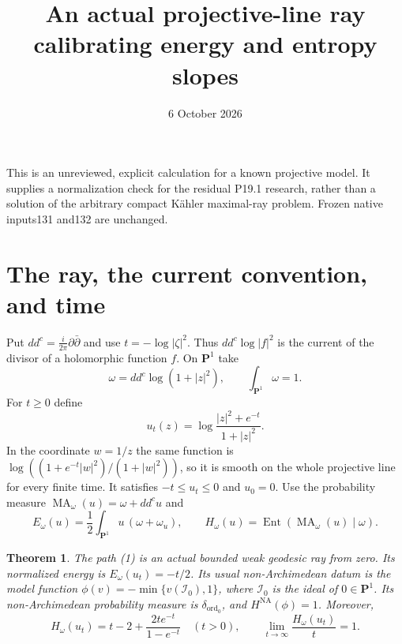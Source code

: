 \documentclass[11pt]{article}
\title{An actual projective-line ray calibrating energy and entropy slopes}
\author{}
\date{6 October 2026}
\newcommand{\ddc}{dd^c}
\newcommand{\NA}{\mathrm{NA}}
\newcommand{\MA}{\operatorname{MA}}
\newcommand{\Ent}{\operatorname{Ent}}
\newtheorem{theorem}{Theorem}
\begin{document}
\maketitle

This is an unreviewed, explicit calculation for a known projective model.
It supplies a normalization check for the residual P19.1 research, rather
than a solution of the arbitrary compact K\"ahler maximal-ray problem.
Frozen native inputs131 and132 are unchanged.

\section{The ray, the current convention, and time}

Put $\ddc=\frac{i}{2\pi}\partial\bar\partial$ and use
$t=-\log|\zeta|^2$. Thus $\ddc\log|f|^2$ is the current of the
divisor of a holomorphic function $f$. On $\mathbf P^1$ take
\[
 \omega=\ddc\log(1+|z|^2),\qquad \int_{\mathbf P^1}\omega=1.
\]
For $t\geq0$ define
\[
 u_t(z)=\log\frac{|z|^2+e^{-t}}{1+|z|^2}.
 \tag{1}
\]
In the coordinate $w=1/z$ the same function is
$\log((1+e^{-t}|w|^2)/(1+|w|^2))$, so it is smooth on the
whole projective line for every finite time. It satisfies
$-t\leq u_t\leq0$ and $u_0=0$.
Use the probability measure $\MA_\omega(u)=\omega+\ddc u$ and
\[
 E_\omega(u)=\frac12\int_{\mathbf P^1}u\,
                  (\omega+\omega_u),\qquad
 H_\omega(u)=\Ent(\MA_\omega(u)\mid\omega).
 \tag{2}
\]

\begin{theorem}
The path (1) is an actual bounded weak geodesic ray from zero. Its
normalized energy is $E_\omega(u_t)=-t/2$. Its usual non-Archimedean
datum is the model function
$\phi(v)=-\min\{v(\mathcal I_0),1\}$, where $\mathcal I_0$ is the
ideal of $0\in\mathbf P^1$. Its non-Archimedean probability measure
is $\delta_{\operatorname{ord}_0}$, and $H^{\NA}(\phi)=1$.
Moreover,
\[
 H_\omega(u_t)
 =t-2+\frac{2t e^{-t}}{1-e^{-t}}\quad(t>0),\qquad
 \lim_{t\to\infty}\frac{H_\omega(u_t)}t=1.
 \tag{3}
\]
\end{theorem}
\end{document}
